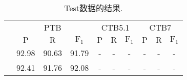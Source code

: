 \begin{table*}[tb!]
  \centering
  \caption{Test数据的结果.}
  \begin{tabularx}{\textwidth}{lccccccccc}
    \toprule
                                                     & \multicolumn{3}{c}{PTB}  & \multicolumn{3}{c}{CTB5.1} & \multicolumn{3}{c}{CTB7}                                                                                                                                     \\
                                                     & $\mathrm{P}$             & $\mathrm{R}$               & $\mathrm{F}_1$           & $\mathrm{P}$             & $\mathrm{R}$             & $\mathrm{F}_1$           & $\mathrm{P}$   & $\mathrm{R}$   & $\mathrm{F}_1$ \\
    \midrule
    \citet{stern-etal-2017-minimal}                  & 92.98                    & 90.63                      & 91.79                    & -                        & -                        & -                        & -              & -              & -              \\
    \citet{gaddy-etal-2018-whats}                    & 92.41                    & 91.76                      & 92.08                    & -                        & -                        & -                        & -              & -              & -              \\

\end{tabularx}
\end{table*}
